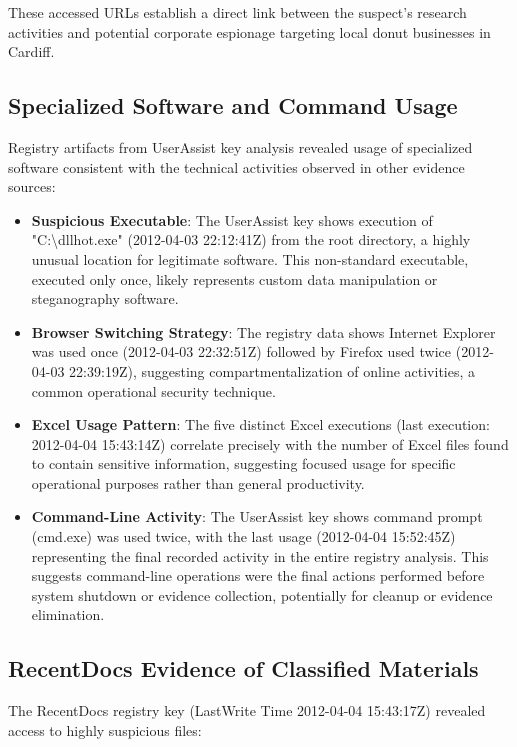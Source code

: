 These accessed URLs establish a direct link between the suspect's research activities and potential corporate espionage targeting local donut businesses in Cardiff.

\subsection{Specialized Software and Command Usage}
Registry artifacts from UserAssist key analysis revealed usage of specialized software consistent with the technical activities observed in other evidence sources:

\begin{itemize}
    \item \textbf{Suspicious Executable}: The UserAssist key shows execution of "C:\textbackslash dllhot.exe" (2012-04-03 22:12:41Z) from the root directory, a highly unusual location for legitimate software. This non-standard executable, executed only once, likely represents custom data manipulation or steganography software.
    
    \item \textbf{Browser Switching Strategy}: The registry data shows Internet Explorer was used once (2012-04-03 22:32:51Z) followed by Firefox used twice (2012-04-03 22:39:19Z), suggesting compartmentalization of online activities, a common operational security technique.
    
    \item \textbf{Excel Usage Pattern}: The five distinct Excel executions (last execution: 2012-04-04 15:43:14Z) correlate precisely with the number of Excel files found to contain sensitive information, suggesting focused usage for specific operational purposes rather than general productivity.
    
    \item \textbf{Command-Line Activity}: The UserAssist key shows command prompt (cmd.exe) was used twice, with the last usage (2012-04-04 15:52:45Z) representing the final recorded activity in the entire registry analysis. This suggests command-line operations were the final actions performed before system shutdown or evidence collection, potentially for cleanup or evidence elimination.
\end{itemize}

\subsection{RecentDocs Evidence of Classified Materials}
The RecentDocs registry key (LastWrite Time 2012-04-04 15:43:17Z) revealed access to highly suspicious files:

